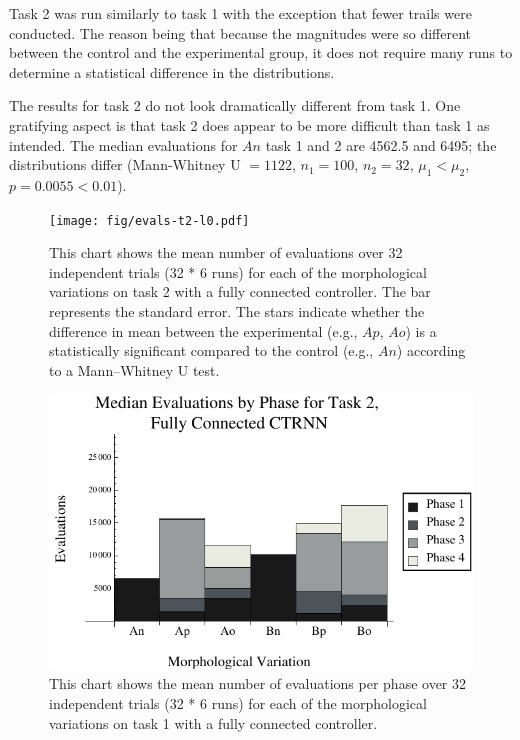 Task 2 was run similarly to task 1 with the exception that fewer
trails were conducted.  The reason being that because the magnitudes
were so different between the control and the experimental group, it
does not require many runs to determine a statistical difference in
the distributions.  

The results for task 2 do not look dramatically different from task 1.
One gratifying aspect is that task 2 does appear to be more difficult
than task 1 as intended.  The median evaluations for $An$ task 1 and 2
are 4562.5 and 6495; the distributions differ (Mann-Whitney U $=1122$,
$n_1 = 100$, $n_2 = 32$, $\mu_1 < \mu_2$, $p = 0.0055 < 0.01$).

\begin{figure}
  \centering
  \texttt{[image: fig/evals-t2-l0.pdf]} 
  \caption[Total evaluations for task 2, fully
    connected]{\label{fig:evals-t2-l0}This chart shows the mean number
    of evaluations over 32 independent trials (32 * 6 runs) for each
    of the morphological variations on task 2 with a fully connected
    controller.  The bar represents the standard error.  The stars
    indicate whether the difference in mean between the experimental
    (e.g., $Ap$, $Ao$) is a statistically significant compared to the
    control (e.g., $An$) according to a Mann--Whitney U test.  }
\end{figure}

\begin{figure}
  \centering
  \includegraphics[scale=1]{fig/step-evals-t2-l0.pdf} 
  \caption[Evaluations by phase for task 2, fully
    connected]{\label{fig:step-evals-t2-l0}This chart shows the mean
    number of evaluations per phase over 32 independent trials (32 * 6
    runs) for each of the morphological variations on task 1 with a
    fully connected controller.  }
\end{figure}
